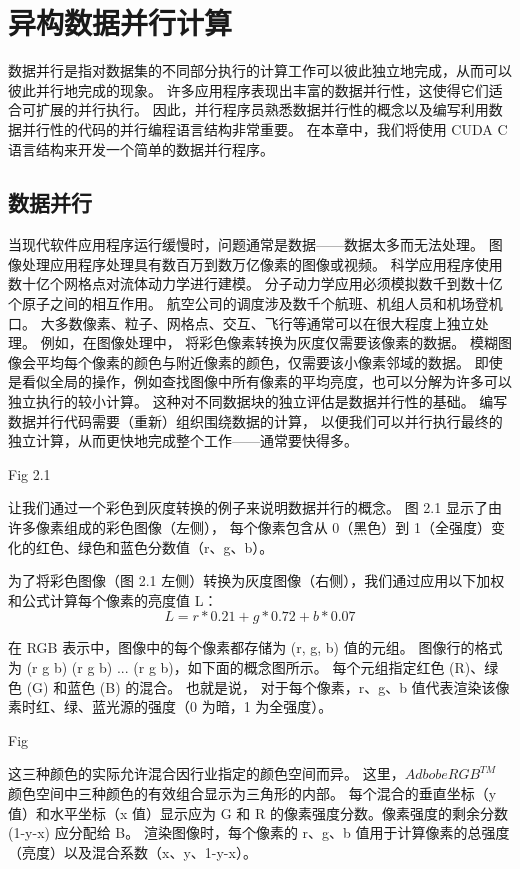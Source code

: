 \section{异构数据并行计算}

数据并行是指对数据集的不同部分执行的计算工作可以彼此独立地完成，从而可以彼此并行地完成的现象。 
许多应用程序表现出丰富的数据并行性，这使得它们适合可扩展的并行执行。 
因此，并行程序员熟悉数据并行性的概念以及编写利用数据并行性的代码的并行编程语言结构非常重要。 
在本章中，我们将使用 CUDA C 语言结构来开发一个简单的数据并行程序。

\subsection{数据并行}
当现代软件应用程序运行缓慢时，问题通常是数据——数据太多而无法处理。 
图像处理应用程序处理具有数百万到数万亿像素的图像或视频。 科学应用程序使用数十亿个网格点对流体动力学进行建模。 
分子动力学应用必须模拟数千到数十亿个原子之间的相互作用。 航空公司的调度涉及数千个航班、机组人员和机场登机口。 
大多数像素、粒子、网格点、交互、飞行等通常可以在很大程度上独立处理。 例如，在图像处理中，
将彩色像素转换为灰度仅需要该像素的数据。 模糊图像会平均每个像素的颜色与附近像素的颜色，仅需要该小像素邻域的数据。 
即使是看似全局的操作，例如查找图像中所有像素的平均亮度，也可以分解为许多可以独立执行的较小计算。 
这种对不同数据块的独立评估是数据并行性的基础。 编写数据并行代码需要（重新）组织围绕数据的计算，
以便我们可以并行执行最终的独立计算，从而更快地完成整个工作——通常要快得多。

{\color{red} Fig 2.1}

让我们通过一个彩色到灰度转换的例子来说明数据并行的概念。 图 2.1 显示了由许多像素组成的彩色图像（左侧），
每个像素包含从 0（黑色）到 1（全强度）变化的红色、绿色和蓝色分数值（r、g、b）。

为了将彩色图像（图 2.1 左侧）转换为灰度图像（右侧），我们通过应用以下加权和公式计算每个像素的亮度值 L：
\begin{equation*}
	L = r*0.21 + g*0.72 + b * 0.07
\end{equation*}

\begin{remark}
在 RGB 表示中，图像中的每个像素都存储为 (r, g, b) 值的元组。 
图像行的格式为 (r g b) (r g b) ... (r g b)，如下面的概念图所示。 
每个元组指定红色 (R)、绿色 (G) 和蓝色 (B) 的混合。 也就是说，
对于每个像素，r、g、b 值代表渲染该像素时红、绿、蓝光源的强度（0 为暗，1 为全强度）。

{\color{red} Fig}

这三种颜色的实际允许混合因行业指定的颜色空间而异。 
这里，$AdbobeRGB^{TM}$ 颜色空间中三种颜色的有效组合显示为三角形的内部。 
每个混合的垂直坐标（y 值）和水平坐标（x 值）显示应为 G 和 R 的像素强度分数。像素强度的剩余分数 (1-y-x) 应分配给 B。 
渲染图像时，每个像素的 r、g、b 值用于计算像素的总强度（亮度）以及混合系数（x、y、1-y-x）。
\end{remark}

